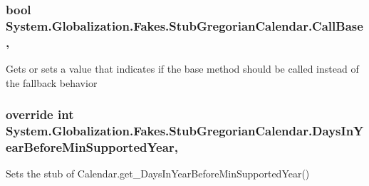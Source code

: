 \hypertarget{class_system_1_1_globalization_1_1_fakes_1_1_stub_gregorian_calendar_a24d7bad6555ee13fa65d2438cefd21f9}{
\subsubsection[{Call\-Base}]{\setlength{\rightskip}{0pt plus 5cm}bool System.\-Globalization.\-Fakes.\-Stub\-Gregorian\-Calendar.\-Call\-Base\hspace{0.3cm}{\ttfamily [get]}, {\ttfamily [set]}}}\label{class_system_1_1_globalization_1_1_fakes_1_1_stub_gregorian_calendar_a24d7bad6555ee13fa65d2438cefd21f9}


Gets or sets a value that indicates if the base method should be called instead of the fallback behavior

\hypertarget{class_system_1_1_globalization_1_1_fakes_1_1_stub_gregorian_calendar_af19f4278a59b2fd25c4fbab955acb812}{
\subsubsection[{Days\-In\-Year\-Before\-Min\-Supported\-Year}]{\setlength{\rightskip}{0pt plus 5cm}override int System.\-Globalization.\-Fakes.\-Stub\-Gregorian\-Calendar.\-Days\-In\-Year\-Before\-Min\-Supported\-Year\hspace{0.3cm}{\ttfamily [get]}, {\ttfamily [protected]}}}\label{class_system_1_1_globalization_1_1_fakes_1_1_stub_gregorian_calendar_af19f4278a59b2fd25c4fbab955acb812}


Sets the stub of Calendar.\-get\-\_\-\-Days\-In\-Year\-Before\-Min\-Supported\-Year()

